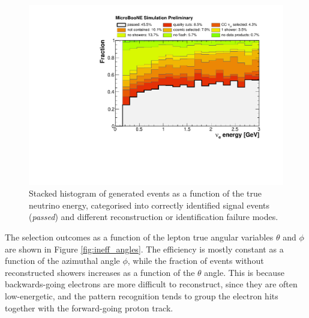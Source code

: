 \begin{figure}
\centering
  \includegraphics[width=0.8\linewidth]{figures/ineff_ene.pdf}
  \caption{Stacked histogram of generated events as a function of the true neutrino energy, categorised into correctly identified signal events {(\emph{passed})} and different reconstruction or identification failure modes.}
  \label{fig:ineff}
\end{figure}

The selection outcomes as a function of the lepton true angular variables $\theta$ and $\phi$ are shown in Figure \ref{fig:ineff_angles}. The efficiency is mostly constant as a function of the azimuthal angle $\phi$, while the fraction of events without reconstructed showers increases as a function of the $\theta$ angle. This is because backwards-going electrons are more difficult to reconstruct, since they are often low-energetic, and the pattern recognition tends to group the electron hits together with the forward-going proton track.

